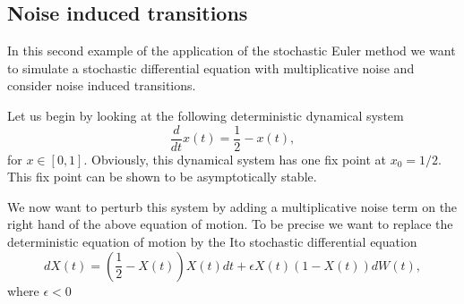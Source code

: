 \subsection{Noise induced transitions}
In this second example of the application of the stochastic Euler 
method we want to simulate a stochastic differential equation with
multiplicative noise and consider noise induced transitions.

Let us begin by looking at the following deterministic dynamical 
system
\begin{equation*}
\frac{d}{dt} x(t) = \frac{1}{2} - x(t),
\end{equation*}
for $x \in [0,1]$. Obviously, this dynamical system has one 
fix point at $x_0=1/2$. This fix point can be shown to be 
asymptotically stable. 

We now want to perturb this system by adding a multiplicative 
noise term on the right hand of the above equation of motion.
To be precise we want to replace the deterministic equation of 
motion by the Ito stochastic differential equation
\begin{equation}
\label{SDENOISEIN}
dX(t) = (\frac{1}{2} - X(t))X(t)dt + \epsilon X(t) (1-X(t)) dW(t),
\end{equation}
where $\epsilon <0$

